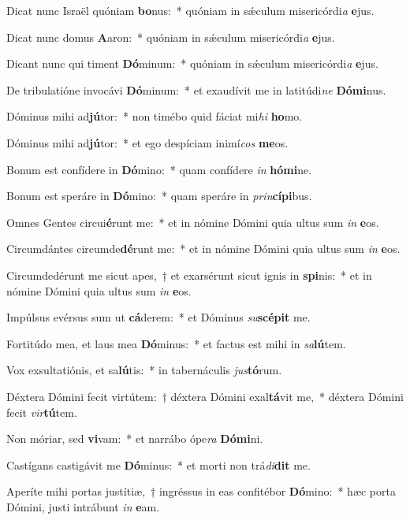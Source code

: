 \item Dicat nunc Israël quóniam \textbf{bo}nus:~* quóniam in sǽculum misericórdi\textit{a} \textbf{e}jus.
\item Dicat nunc domus \textbf{A}aron:~* quóniam in sǽculum misericórdi\textit{a} \textbf{e}jus.
\item Dicant nunc qui timent \textbf{Dó}minum:~* quóniam in sǽculum misericórdi\textit{a} \textbf{e}jus.
\item De tribulatióne invocávi \textbf{Dó}minum:~* et exaudívit me in latitúdi\textit{ne} \textbf{Dó}\textbf{mi}nus.
\item Dóminus mihi ad\textbf{jú}tor:~* non timébo quid fáciat mi\textit{hi} \textbf{ho}mo.
\item Dóminus mihi ad\textbf{jú}tor:~* et ego despíciam inimí\textit{cos} \textbf{me}os.
\item Bonum est confídere in \textbf{Dó}mino:~* quam confídere \textit{in} \textbf{hó}\textbf{mi}ne.
\item Bonum est speráre in \textbf{Dó}mino:~* quam speráre in \textit{prin}\textbf{cí}\textbf{pi}bus.
\item Omnes Gentes circui\textbf{é}runt me:~* et in nómine Dómini quia ultus sum \textit{in} \textbf{e}os.
\item Circumdántes circumde\textbf{dé}runt me:~* et in nómine Dómini quia ultus sum \textit{in} \textbf{e}os.
\item Circumdedérunt me sicut apes,~† et exarsérunt sicut ignis in \textbf{spi}nis:~* et in nómine Dómini quia ultus sum \textit{in} \textbf{e}os.
\item Impúlsus evérsus sum ut \textbf{cá}derem:~* et Dóminus \textit{su}\textbf{scé}\textbf{pit} me.
\item Fortitúdo mea, et laus mea \textbf{Dó}minus:~* et factus est mihi in \textit{sa}\textbf{lú}tem.
\item Vox exsultatiónis, et sa\textbf{lú}tis:~* in tabernáculis \textit{jus}\textbf{tó}rum.
\item Déxtera Dómini fecit virtútem:~† déxtera Dómini exal\textbf{tá}vit me,~* déxtera Dómini fecit \textit{vir}\textbf{tú}tem.
\item Non móriar, sed \textbf{vi}vam:~* et narrábo ópe\textit{ra} \textbf{Dó}\textbf{mi}ni.
\item Castígans castigávit me \textbf{Dó}minus:~* et morti non trá\textit{di}\textbf{dit} me.
\item Aperíte mihi portas justítiæ,~† ingréssus in eas confitébor \textbf{Dó}mino:~* hæc porta Dómini, justi intrábunt \textit{in} \textbf{e}am.
